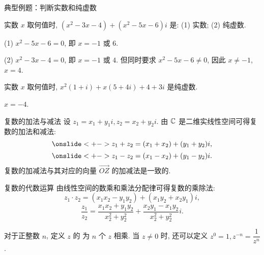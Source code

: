 \begin{frame}{典型例题：判断实数和纯虚数}
\begin{example}
实数 $x$ 取何值时, $(x^2-3x-4)+(x^2-5x-6)i$ 是: (1) 实数; (2) 纯虚数.
\end{example}
\begin{solution}
(1) $x^2-5x-6=0$, 即 $x=-1$ 或 $6$.

\onslide<+->
(2) $x^2-3x-4=0$, 即 $x=-1$ 或 $4$.
\onslide<+->
但同时要求 $x^2-5x-6\neq 0$, 因此 $x\neq -1$, $x=4$.
\end{solution}

\begin{exercise}
实数 $x$ 取何值时, $x^2(1+i)+x(5+4i)+4+3i$ 是纯虚数.
\end{exercise}
\begin{answer}
$x=-4$.
\end{answer}
\end{frame}


\begin{frame}{复数的加法与减法}
\onslide<+->
设 $z_1=x_1+y_1i,z_2=x_2+y_2i$.
\onslide<+->
由 ${\mathbb{C}}$ 是二维实线性空间可得复数的加法和减法:
\[\onslide<+->{z_1+z_2=(x_1+x_2)+(y_1+y_2)i,}\]
\vspace{-\baselineskip}
\[\onslide<+->{z_1-z_2=(x_1-x_2)+(y_1-y_2)i.}\]
\vspace{-\baselineskip}
\onslide<+->
复数的加减法与其对应的向量 $\overrightarrow{OZ}$ 的加减法是一致的.

\onslide<+->
\begin{center}
\end{center}
\end{frame}


\begin{frame}{复数的代数运算}
\onslide<+->
\onslide<+->
由线性空间的数乘和乘法分配律可得复数的乘除法:
\onslide<+->
\[z_1\cdot z_2=(x_1x_2-y_1y_2)+(x_1y_2+x_2y_1)i,\]
\onslide<+->
\vspace{-\baselineskip}
\[\frac{z_1}{z_2}=\frac{x_1x_2+y_1y_2}{x_2^2+y_2^2}+\frac{x_2y_1-x_1y_2}{x_2^2+y_2^2}i.\]

\onslide<+->
对于正整数 $n$, 定义 $z$ 的 为 $n$ 个 $z$ 相乘.
\onslide<+->
当 $z\neq 0$ 时, 还可以定义 $z^0=1,z^{-n}=\dfrac1{z^n}$.
\end{frame}


